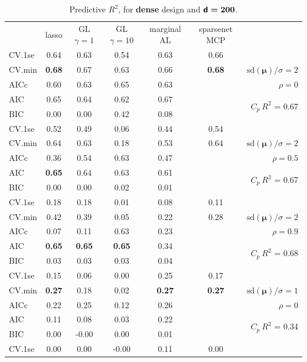 \documentclass[12pt]{article}
\newcommand{\mr}[1]{\mathrm{#1}}
\newcommand{\bm}[1]{\mathbf{#1}}
\begin{document}
\begin{table}[p]\vspace{-.5cm}
\caption[l]{ Predictive $R^2$, for {\bf dense} design and  $\boldsymbol{{\sf d}=200}$.}
\vspace{-.5cm}
\small{}
\begin{center}
\begin{tabular}{l*{5}{c}|r}
 & lasso & GL $\gamma=1$ & GL $\gamma=10$ & marginal AL & sparsenet MCP  &  \\
CV.1se & 0.64 & 0.63 & 0.54 & 0.63 & 0.66 &\\
CV.min & {\bf 0.68} & 0.67 & 0.63 & 0.66 & {\bf 0.68} &  $\mr{sd}(\bm{\mu})/\sigma=2$ \\
AICc & 0.60 & 0.63 & 0.65 & 0.63 & & $\rho=0$ \\
AIC & 0.65 & 0.64 & 0.62 & 0.67 & & \multirow{2}{*}{$C_p ~ R^2$ = 0.67} \\
BIC & 0.00 & 0.00 & 0.42 & 0.08 & & \\
 \hline 
CV.1se & 0.52 & 0.49 & 0.06 & 0.44 & 0.54 &\\
CV.min & 0.64 & 0.63 & 0.18 & 0.53 & 0.64 &  $\mr{sd}(\bm{\mu})/\sigma=2$ \\
AICc & 0.36 & 0.54 & 0.63 & 0.47 & & $\rho=0.5$ \\
AIC & {\bf 0.65} & 0.64 & 0.63 & 0.61 & & \multirow{2}{*}{$C_p ~ R^2$ = 0.67} \\
BIC & 0.00 & 0.00 & 0.02 & 0.01 & & \\
 \hline 
CV.1se & 0.18 & 0.18 & 0.01 & 0.08 & 0.11 &\\
CV.min & 0.42 & 0.39 & 0.05 & 0.22 & 0.28 &  $\mr{sd}(\bm{\mu})/\sigma=2$ \\
AICc & 0.07 & 0.11 & 0.63 & 0.23 & & $\rho=0.9$ \\
AIC & {\bf 0.65} & {\bf 0.65} & {\bf 0.65} & 0.34 & & \multirow{2}{*}{$C_p ~ R^2$ = 0.68} \\
BIC & 0.03 & 0.03 & 0.03 & 0.04 & & \\
 \hline 
CV.1se & 0.15 & 0.06 & 0.00 & 0.25 & 0.17 &\\
CV.min & {\bf 0.27} & 0.18 & 0.02 & {\bf 0.27} & {\bf 0.27} &  $\mr{sd}(\bm{\mu})/\sigma=1$ \\
AICc & 0.22 & 0.25 & 0.12 & 0.26 & & $\rho=0$ \\
AIC & 0.11 & 0.08 & 0.03 & 0.22 & & \multirow{2}{*}{$C_p ~ R^2$ = 0.34} \\
BIC & 0.00 & -0.00 & 0.00 & 0.01 & & \\
 \hline 
CV.1se & 0.00 & 0.00 & -0.00 & 0.11 & 0.00 &\\

\end{tabular}
\end{center}
\end{table}
\end{document}
